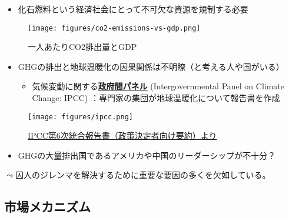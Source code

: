 \documentclass[
  xelatex,
  ja=standard]{bxjsarticle}
\providecommand{\tightlist}{%
  \setlength{\itemsep}{0pt}\setlength{\parskip}{0pt}}\usepackage{longtable,booktabs,array}
\begin{document}
\begin{itemize}
\tightlist
\item
  化石燃料という経済社会にとって不可欠な資源を規制する必要
\end{itemize}

\begin{figure}[htpb]

{\centering \texttt{[image: figures/co2-emissions-vs-gdp.png]}

}

\caption{一人あたりCO2排出量とGDP}

\end{figure}

\begin{itemize}
\tightlist
\item
  GHGの排出と地球温暖化の因果関係は不明瞭（と考える人や国がいる）

  \begin{itemize}
  \tightlist
  \item
    気候変動に関する\href{https://www.data.jma.go.jp/cpdinfo/ipcc/index.html}{\textbf{政府間パネル}}
    (Intergovernmental Panel on Climate Change: IPCC)
    ：専門家の集団が地球温暖化について報告書を作成
  \end{itemize}
\end{itemize}

\begin{figure}[htpb]

{\centering \texttt{[image: figures/ipcc.png]}

}

\caption{\href{https://www.ipcc.ch/report/sixth-assessment-report-cycle/}{IPCC第6次統合報告書（政策決定者向け要約）より}}

\end{figure}

\begin{itemize}
\tightlist
\item
  GHGの大量排出国であるアメリカや中国のリーダーシップが不十分？
\end{itemize}

\(\leadsto\)囚人のジレンマを解決するために重要な要因の多くを欠如している。

\hypertarget{ux5e02ux5834ux30e1ux30abux30cbux30baux30e0}{%
\subsection{市場メカニズム}\label{ux5e02ux5834ux30e1ux30abux30cbux30baux30e0}}
\end{document}
